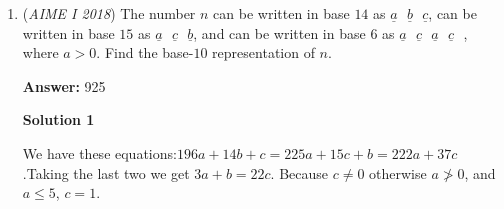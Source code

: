 \begin{enumerate}
First I thought the special case of the problem is when the factors are repeated, which looks like this: 

 \begin{verbatim}
$(x+r)^2$
\end{verbatim}

There are 50 ways for this to happen because r can be from $1$ to $50$ ($(x+50)^2 = x^2+100x+50^2$ and $a\leq 50$).

 Now I thought how can you make the other cases? It looks like $(x-r)(x-s)$ so by Vieta's $r+s=a$. This looks like Stars and Bars

 because $a=1+1+1+1+...$ and you're giving the indistinguishable ones to $r$ and $s$. For $a=1$, there are $\binom{1+2-1}{2-1} = 2$

 ways. For $a=2$, there are $\binom{2+2-1}{2-1} = 3$ ways. Now you see the pattern which is $2+3+...+100+101$ for $a=1, 2, ...100$. 

 This equals $103\cdot50$ ways in total. However, now you realize that $r$ and $s$ can be flipped and it gives the same. So, 

 subtract the cases when $r = s$ which we found to be $50$. Now from the remaining double-counted $102\cdot50$ divide by two to

 eliminate the double-counting. We have $51\cdot50$, but remember to add back in the $50$ ways that weren't double-counted to begin

 with. That gives us $52\cdot50 = 2600$ ways and the requested remainder is $600.$

 -unhappyfarmer

 


	\item (\textit{AIME I 2018}) The number $n$ can be written in base $14$ as $\underline{a}\text{ }\underline{b}\text{ }\underline{c}$, can be written in base $15$ as $\underline{a}\text{ }\underline{c}\text{ }\underline{b}$, and can be written in base $6$ as $\underline{a}\text{ }\underline{c}\text{ }\underline{a}\text{ }\underline{c}\text{ }$, where $a > 0$. Find the base-$10$ representation of $n$.


 
 \textbf{Answer: }925



\textbf{Solution 1}

We have these equations:$196a+14b+c=225a+15c+b=222a+37c$.Taking the last two we get $3a+b=22c$. Because $c \neq 0$ otherwise $a \ngtr 0$, and $a \leq 5$, $c=1$.


\end{enumerate}

